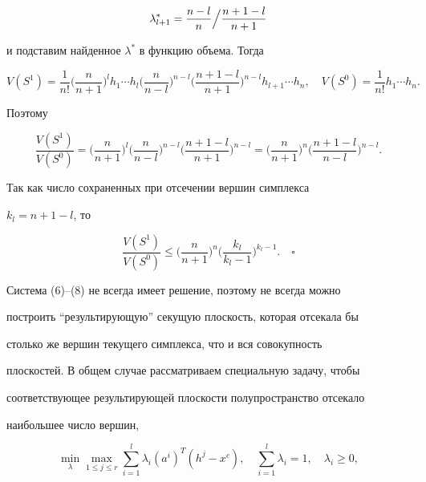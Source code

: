 $$


\lambda^*_{l+1}=\frac{n-l}{n}\Bigl.\Bigr/


\frac{n+1-l}{n+1}


$$


и подставим найденное $\lambda^*$ в функцию объема. Тогда


$$


V(S^1)=\frac{1}{n!}\biggl(\frac{n}{n+1}\biggr)^lh_1\dotsb h_l


\biggl(\frac{n}{n-l}\biggr)^{n-l}\biggl(\frac{n+1-l}{n+1}


\biggr)^{n-l}h_{l+1}\dotsb h_n,\quad


V(S^0)=\frac{1}{n!}h_1\dotsb h_n.


$$


Поэтому


$$


\frac{V(S^1)}{V(S^0)}=\biggl(\frac{n}{n+1}\biggr)^l


\biggl(\frac{n}{n-l}\biggr)^{n-l}\biggl(\frac{n+1-l}{n+1}


\biggr)^{n-l}=\biggl(\frac{n}{n+1}\biggr)^n


\biggl(\frac{n+1-l}{n-l}\biggr)^{n-l}.


$$


Так как число сохраненных при отсечении вершин симплекса


$k_l=n+1-l$, то


$$


\frac{V(S^1)}{V(S^0)}\le\biggl(\frac{n}{n+1}\biggr)^n


\biggl(\frac{k_l}{k_l-1}\biggr)^{k_l-1}.\quad\square


$$





Система (6)--(8) не всегда имеет решение, поэтому не всегда можно


построить ``результирующую'' секущую плоскость, которая отсекала бы


столько же вершин текущего симплекса, что и вся совокупность


плоскостей. В общем случае рассматриваем специальную задачу, чтобы


соответствующее результирующей плоскости полупространство отсекало


наибольшее число вершин,


\begin{equation}


\min_\lambda \max_{1\le j\le r}\sum^l_{i=1}


\lambda_i(a^i)^T(h^j-x^c),\quad


\sum^l_{i=1}\lambda_i=1,\quad \lambda_i\ge 0,


\end{equation}


